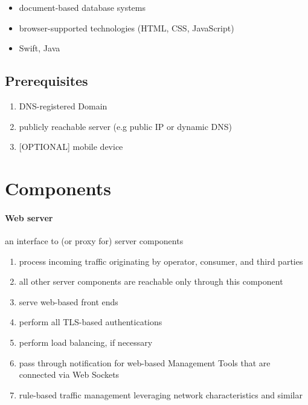\documentclass[12pt,english,a4paper,titlepage,cleardoublepage=empty,dottedtoc]{report}
\providecommand{\tightlist}{%
  \setlength{\itemsep}{0pt}\setlength{\parskip}{0pt}}
\begin{document}
\begin{itemize}
\tightlist
\item
  document-based database systems
\item
  browser-supported technologies (HTML, CSS, JavaScript)
\item
  Swift, Java
\end{itemize}

\subsection{Prerequisites}\label{prerequisites}

\begin{enumerate}
\def\labelenumi{\alph{enumi})}
\tightlist
\item
  DNS-registered Domain
\item
  publicly reachable server (e.g public IP or dynamic DNS)
\item
  {[}OPTIONAL{]} mobile device
\end{enumerate}

\section{Components}\label{components}

\paragraph{Web server}\label{web-server-1}

an interface to (or proxy for) server components

\begin{enumerate}
\def\labelenumi{\alph{enumi})}
\tightlist
\item
  process incoming traffic originating by operator, consumer, and third
  parties
\item
  all other server components are reachable only through this component
\item
  serve web-based front ends
\item
  perform all TLS-based authentications
\item
  perform load balancing, if necessary
\item
  pass through notification for web-based Management Tools that are
  connected via Web Sockets
\item
  rule-based traffic management leveraging network characteristics and
  similar
\end{enumerate}
\end{document}
